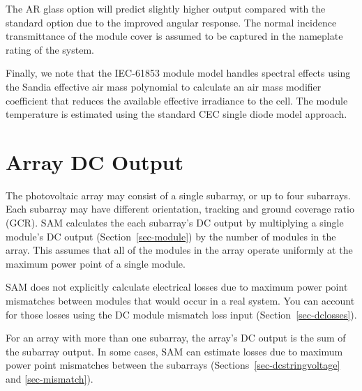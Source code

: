 \documentclass[12pt,letterpaper]{article}
\begin{document}
The AR glass option will predict slightly higher output compared with the standard option due to the improved angular response.  The normal incidence transmittance of the module cover is assumed to be captured in the nameplate rating of the system. 

Finally, we note that the IEC-61853 module model handles spectral effects using the Sandia effective air mass polynomial to calculate an air mass modifier coefficient that reduces the available effective irradiance to the cell. The module temperature is estimated using the standard CEC single diode model approach.


\chapter{Array DC Output}\label{sec-arraydcoutput}

The photovoltaic array may consist of a single subarray, or up to four subarrays. Each subarray may have different orientation, tracking and ground coverage ratio (GCR). SAM calculates the each subarray's DC output by multiplying a single module's DC output (Section~\ref{sec-module}) by the number of modules in the array. This assumes that all of the modules in the array operate uniformly at the maximum power point of a single module. 

SAM does not explicitly calculate electrical losses due to maximum power point mismatches between modules that would occur in a real system. You can account for those losses using the DC module mismatch loss input  (Section~\ref{sec-dclosses}).

For an array with more than one subarray, the array's DC output is the sum of the subarray output. In some cases, SAM can estimate losses due to maximum power point mismatches between the subarrays (Sections~\ref{sec-dcstringvoltage} and \ref{sec-mismatch}).
\end{document}
